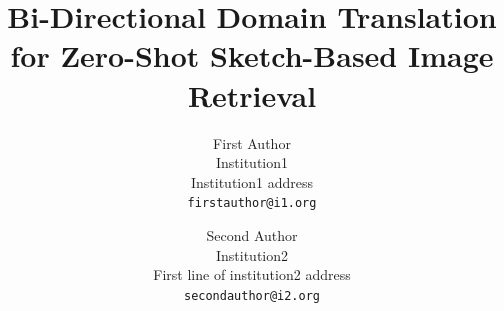 \documentclass[10pt,twocolumn,letterpaper]{article}
\begin{document}
\title{Bi-Directional Domain Translation for Zero-Shot Sketch-Based Image Retrieval}

\author{First Author\\
Institution1\\
Institution1 address\\
{\tt\small firstauthor@i1.org}
\and
Second Author\\
Institution2\\
First line of institution2 address\\
{\tt\small secondauthor@i2.org}
}

\maketitle

\maketitle
\end{document}
